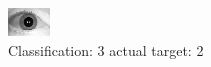 \begin{figure}[h!]
\begin{center}
\includegraphics[width=0.60\columnwidth]{figures/ID1668_class_3_target_2.png}
\end{center}
\caption{ Classification: 3 actual target: 2}
\label{fig:ID1668_class_3_target_2}
\end{figure}
